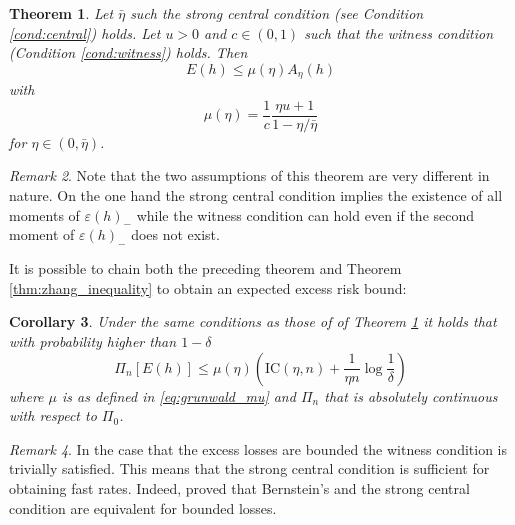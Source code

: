 \documentclass{uvamath}
\newcommand*{\paren}[1]{\left(#1\right)}
\newcommand*{\IC}{\mathrm{IC}}
\newtheorem{theorem}{Theorem}[section]
\newtheorem{corollary}[theorem]{Corollary}
\theoremstyle{remark}
\newtheorem{remark}[theorem]{Remark}
\theoremstyle{definition}
\theoremstyle{definition}
\theoremstyle{definition}
\theoremstyle{definition}
\theoremstyle{definition}
\begin{document}
\begin{theorem}\label{thm:annealed_inverse_bound}
  Let $\bar{\eta}$ such the strong central condition (see Condition
  \ref{cond:central}) holds. Let $u>0$ and $c\in (0,1)$ such that the
  witness condition (Condition \ref{cond:witness}) holds. Then
  \begin{equation*}
    E(h) \leq \mu(\eta) A_\eta(h)
  \end{equation*}
  with
  \begin{equation}\label{eq:grunwald_mu}
    \mu(\eta) = \frac{1}{c}\frac{\eta u + 1}{1 - \eta/\bar{\eta}}
  \end{equation}
  for $\eta\in (0,\bar{\eta})$.
\end{theorem}

\begin{remark}
  Note that the two assumptions of this theorem are very different in
  nature. On the one hand the strong central condition implies the
  existence of all moments of $\varepsilon(h)_-$ while the witness
  condition can hold even if the second moment of $\varepsilon(h)_-$
  does not exist.
\end{remark}
It is possible to chain both the preceding theorem and Theorem
\ref{thm:zhang_inequality} to obtain an expected excess risk bound:
\begin{corollary}\label{cor:risk_bound}
  Under the same conditions as those of of Theorem
  \ref{thm:annealed_inverse_bound} it holds that with probability
  higher than $1-\delta$
\begin{equation*}
  \Pi_n[ E(h)] \leq
  \mu(\eta)\paren{\IC(\eta,n) +
    \frac{1}{\eta n}\log\frac{1}{\delta}}
\end{equation*}
where $\mu$ is as defined in \eqref{eq:grunwald_mu} and $\Pi_n$ that
is absolutely continuous with respect to $\Pi_0$.
\end{corollary}

\begin{remark}\label{rem:risk_bound_bounded_excess}
  In the case that the excess losses are bounded the witness condition
  is trivially satisfied. This means that the strong central condition
  is sufficient for obtaining fast rates. Indeed,
  \citet{van_erven_fast_2015} proved that Bernstein's and the strong
  central condition are equivalent for bounded losses.
\end{remark}
\end{document}
